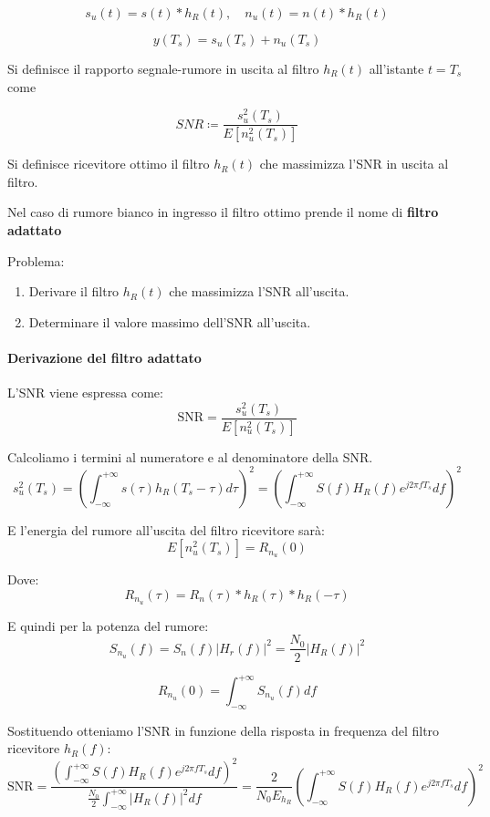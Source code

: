 \[
    s_u(t) = s(t) \ast h_R(t), \quad n_u(t) = n(t) \ast h_R(t)
\]

\[
    y(T_s) = s_u(T_s) + n_u(T_s)
\]

Si definisce il rapporto segnale-rumore in uscita al filtro \( h_R(t) \) all'istante \( t = T_s \) come

\[
    SNR \coloneqq \frac{s_u^2(T_s)}{E[n_u^2(T_s)]}
\]

Si definisce ricevitore ottimo il filtro \( h_R(t) \) che massimizza l'SNR in uscita al filtro.

Nel caso di rumore bianco in ingresso il filtro ottimo prende il nome di \textbf{filtro adattato}

Problema:
\begin{enumerate}
    \item Derivare il filtro \( h_R(t) \) che massimizza l'SNR all'uscita.
    \item Determinare il valore massimo dell'SNR all'uscita.
\end{enumerate}


\paragraph*{Derivazione del filtro adattato}

L'SNR viene espressa come:
\[
    \text{SNR} = \frac{s_u^2(T_s)}{E[n_u^2(T_s)]}
\]

Calcoliamo i termini al numeratore e al denominatore della SNR.
\[
    s_u^2(T_s) = \left( \int_{-\infty}^{+\infty} s(\tau) h_R(T_s - \tau) d\tau \right)^2 = \left( \int_{-\infty}^{+\infty} S(f) H_R(f) e^{j2\pi fT_s} df \right)^2
\]

E l'energia del rumore all'uscita del filtro ricevitore sarà:
\[
    E[n_u^2(T_s)] = R_{n_u}(0)
\]

Dove:
\[
    R_{n_u}(\tau) = R_n(\tau) \ast h_R(\tau) \ast h_R(-\tau)
\]

E quindi per la potenza del rumore:
\[
    S_{n_u}(f) = S_n(f) \left| H_r(f) \right|^2 = \frac{N_0}{2} \left| H_R(f) \right|^2
\]

\[
    R_{n_u}(0) = \int_{-\infty}^{+\infty} S_{n_u}(f) df
\]

Sostituendo otteniamo l'SNR in funzione della risposta in frequenza del filtro ricevitore \( h_R(f) \):
\[
    \text{SNR} = \frac{\left( \int_{-\infty}^{+\infty} S(f) H_R(f) e^{j2\pi fT_s} df \right)^2}{\frac{N_0}{2} \int_{-\infty}^{+\infty} \left| H_R(f) \right|^2 df} = \frac{2}{N_0 E_{h_R}} \left( \int_{-\infty}^{+\infty} S(f) H_R(f) e^{j2\pi fT_s} df \right)^2
\]

